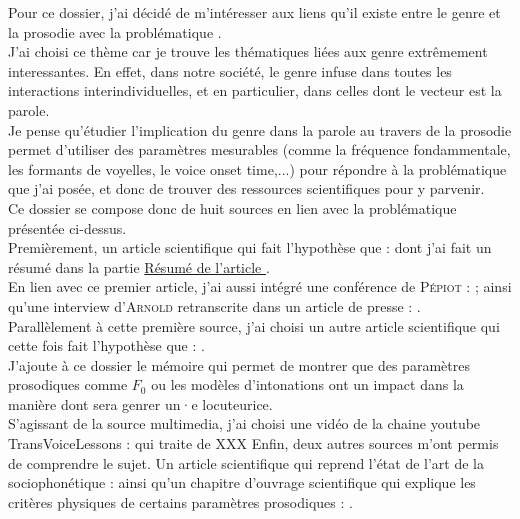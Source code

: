 Pour ce dossier, j'ai décidé de m'intéresser aux liens qu'il existe entre le genre et la prosodie avec la problématique . \\
J'ai choisi ce thème car je trouve les thématiques liées aux genre extrêmement interessantes.
En effet, dans notre société, le genre infuse dans toutes les interactions interindividuelles, et en particulier, dans celles dont le vecteur est la parole. \\
Je pense qu'étudier l'implication du genre dans la parole au travers de la prosodie permet d'utiliser des paramètres mesurables (comme la fréquence fondammentale, les formants de voyelles, le voice onset time,...) pour répondre à la problématique que j'ai posée, et donc de trouver des ressources scientifiques pour y parvenir.\\

Ce dossier se compose donc de huit sources en lien avec la problématique présentée ci-dessus.\\
Premièrement, un article scientifique qui fait l'hypothèse que  : \cite{Pep20} dont j'ai fait un résumé dans la partie \hyperref[sec:resume]{Résumé de l'article \cite{Pep20}}.\\
En lien avec ce premier article, j'ai aussi intégré une conférence de \textsc{Pépiot} : \cite{Pep16}; ainsi qu'une interview d'\textsc{Arnold} retranscrite dans un article de presse : \cite{Bro18}.\\
Parallèlement à cette première source, j'ai choisi un autre article scientifique qui cette fois fait l'hypothèse que  : \cite{Boe75}.\\
J'ajoute à ce dossier le mémoire \cite{Gar22} qui permet de montrer que des paramètres prosodiques comme $F_0$ ou les modèles d'intonations ont un impact dans la manière dont sera genrer un·e locuteurice.\\
S'agissant de la source multimedia, j'ai choisi une vidéo de la chaine youtube TransVoiceLessons : \cite{video} qui traite de XXX
Enfin, deux autres sources m'ont permis de comprendre le sujet. Un article scientifique qui reprend l'état de l'art de la sociophonétique : \cite{Can15} ainsi qu'un chapitre d'ouvrage scientifique qui explique les critères physiques de certains paramètres prosodiques : \cite{DiC13}.\\

